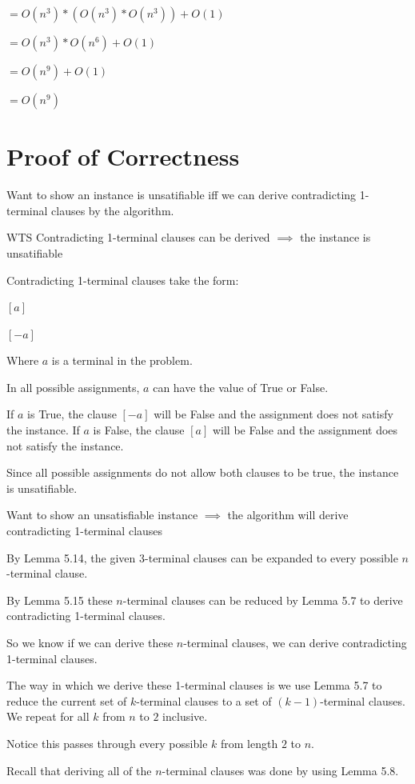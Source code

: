 \documentclass[manuscript]{acmart}
\begin{document}
    $= O(n^3) * (O(n^3) * O(n^3)) + O(1)$

    $= O(n^3) * O(n^6) + O(1)$

    $= O(n^9) + O(1)$

    $= O(n^9)$

    \section{Proof of Correctness}

    Want to show an instance is unsatifiable iff we can derive contradicting
    1-terminal clauses by the algorithm.

    WTS Contradicting 1-terminal clauses can be derived $\implies$ the instance is unsatifiable

    Contradicting 1-terminal clauses take the form:

    $[a]$

    $[-a]$

    Where $a$ is a terminal in the problem.

    In all possible assignments, $a$ can have the value of True or False.

    If $a$ is True, the clause $[-a]$ will be False and the assignment does not satisfy the instance.
    If $a$ is False, the clause $[a]$ will be False and the assignment does not satisfy the instance.

    Since all possible assignments do not allow both clauses to be true, 
    the instance is unsatifiable.

    Want to show an unsatisfiable instance $\implies$ the algorithm will derive contradicting 1-terminal clauses

    By Lemma 5.14, the given 3-terminal clauses can be expanded to every
    possible $n$-terminal clause.

    By Lemma 5.15 these $n$-terminal clauses can be reduced by Lemma 5.7
    to derive contradicting 1-terminal clauses.

    So we know if we can derive these $n$-terminal clauses, we can derive
    contradicting 1-terminal clauses.

    The way in which we derive these 1-terminal clauses is we use
    Lemma 5.7 to reduce the current set of $k$-terminal clauses to
    a set of $(k-1)$-terminal clauses. We repeat for all $k$ from $n$ to $2$
    inclusive.

    Notice this passes through every possible $k$ from length $2$ to $n$.

    Recall that deriving all of the $n$-terminal clauses was done by using
    Lemma 5.8.
\end{document}
